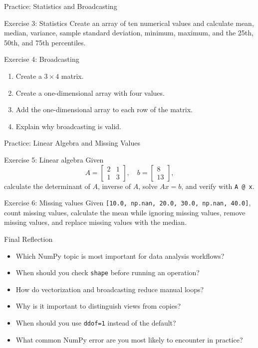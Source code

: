 \documentclass[aspectratio=169,11pt]{beamer}
\begin{document}
\begin{frame}{Practice: Statistics and Broadcasting}
\small
\begin{block}{Exercise 3: Statistics}
Create an array of ten numerical values and calculate mean, median, variance, sample standard deviation, minimum, maximum, and the 25th, 50th, and 75th percentiles.
\end{block}
\begin{block}{Exercise 4: Broadcasting}
\begin{enumerate}
  \item Create a \(3 \times 4\) matrix.
  \item Create a one-dimensional array with four values.
  \item Add the one-dimensional array to each row of the matrix.
  \item Explain why broadcasting is valid.
\end{enumerate}
\end{block}
\end{frame}

\begin{frame}{Practice: Linear Algebra and Missing Values}
\small
\begin{block}{Exercise 5: Linear algebra}
Given
\[
A=\begin{bmatrix}2&1\\ 1&3\end{bmatrix},\quad b=\begin{bmatrix}8\\ 13\end{bmatrix},
\]
calculate the determinant of \(A\), inverse of \(A\), solve \(Ax=b\), and verify with \texttt{A @ x}.
\end{block}
\begin{block}{Exercise 6: Missing values}
Given \texttt{[10.0, np.nan, 20.0, 30.0, np.nan, 40.0]}, count missing values, calculate the mean while ignoring missing values, remove missing values, and replace missing values with the median.
\end{block}
\end{frame}

\begin{frame}{Final Reflection}
\small
\begin{itemize}
  \item Which NumPy topic is most important for data analysis workflows?
  \item When should you check \texttt{shape} before running an operation?
  \item How do vectorization and broadcasting reduce manual loops?
  \item Why is it important to distinguish views from copies?
  \item When should you use \texttt{ddof=1} instead of the default?
  \item What common NumPy error are you most likely to encounter in practice?
\end{itemize}
\end{frame}
\end{document}
